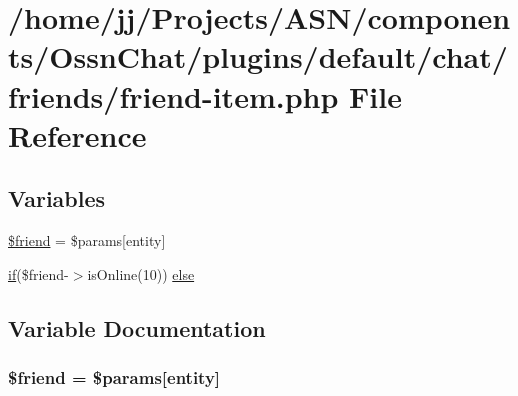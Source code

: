 \hypertarget{components_2_ossn_chat_2plugins_2default_2chat_2friends_2friend-item_8php}{}\section{/home/jj/\+Projects/\+A\+S\+N/components/\+Ossn\+Chat/plugins/default/chat/friends/friend-\/item.php File Reference}
\label{components_2_ossn_chat_2plugins_2default_2chat_2friends_2friend-item_8php}
\subsection*{Variables}
\begin{DoxyCompactItemize}
\item 
\hyperlink{components_2_ossn_chat_2plugins_2default_2chat_2friends_2friend-item_8php_a614b5c5dbf84346f452abdd7d0429bce}{\$friend} = \$params\mbox{[}\textquotesingle{}entity\textquotesingle{}\mbox{]}
\item 
\hyperlink{jquery_8tokeninput_8js_ad8dd46a3cbc004569e34401e9e71771a}{if}(\$friend-\/$>$is\+Online(10)) \hyperlink{components_2_ossn_chat_2plugins_2default_2chat_2friends_2friend-item_8php_ae7fb94bbc6a8d91f8b55e0963d7ef464}{else}
\end{DoxyCompactItemize}


\subsection{Variable Documentation}
\subsubsection[{\texorpdfstring{\$friend}{$friend}}]{\setlength{\rightskip}{0pt plus 5cm}\$friend = \$params\mbox{[}\textquotesingle{}entity\textquotesingle{}\mbox{]}}\hypertarget{components_2_ossn_chat_2plugins_2default_2chat_2friends_2friend-item_8php_a614b5c5dbf84346f452abdd7d0429bce}{}\label{components_2_ossn_chat_2plugins_2default_2chat_2friends_2friend-item_8php_a614b5c5dbf84346f452abdd7d0429bce}


